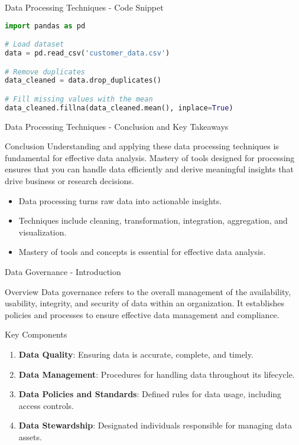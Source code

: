 \documentclass[aspectratio=169]{beamer}
\begin{document}
\begin{frame}[fragile]{Data Processing Techniques - Code Snippet}
    \begin{lstlisting}[language=Python]
import pandas as pd

# Load dataset
data = pd.read_csv('customer_data.csv')

# Remove duplicates
data_cleaned = data.drop_duplicates()

# Fill missing values with the mean
data_cleaned.fillna(data_cleaned.mean(), inplace=True)
    \end{lstlisting}
\end{frame}

\begin{frame}[fragile]{Data Processing Techniques - Conclusion and Key Takeaways}
    \begin{block}{Conclusion}
        Understanding and applying these data processing techniques is fundamental for effective data analysis. Mastery of tools designed for processing ensures that you can handle data efficiently and derive meaningful insights that drive business or research decisions.
    \end{block}

    \begin{itemize}
        \item Data processing turns raw data into actionable insights.
        \item Techniques include cleaning, transformation, integration, aggregation, and visualization.
        \item Mastery of tools and concepts is essential for effective data analysis.
    \end{itemize}
\end{frame}

\begin{frame}[fragile]{Data Governance - Introduction}
    \begin{block}{Overview}
        Data governance refers to the overall management of the availability, usability, integrity, and security of data within an organization. 
        It establishes policies and processes to ensure effective data management and compliance.
    \end{block}

    \begin{block}{Key Components}
        \begin{enumerate}
            \item \textbf{Data Quality}: Ensuring data is accurate, complete, and timely.
            \item \textbf{Data Management}: Procedures for handling data throughout its lifecycle.
            \item \textbf{Data Policies and Standards}: Defined rules for data usage, including access controls.
            \item \textbf{Data Stewardship}: Designated individuals responsible for managing data assets.
        \end{enumerate}
    \end{block}
\end{frame}
\end{document}
